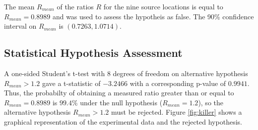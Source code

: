\documentclass[submit, 12pt]{aiaa-pretty-modified}
\begin{document}
\begin{table}[htb]
\centering
{}
\caption{Experimental Data \label{tab:data} }
\end{table}

The mean $R_{mean}$ of the ratios $R$ for the nine source locations is equal to
$R_{mean} = 0.8989$ and was used to assess the hypotheis as false. The
90\% confidence interval on $R_{mean}$ is $(0.7263, 1.0714)$.

\subsection{Statistical Hypothesis Assessment}
A one-sided Student's t-test with 8 degrees of freedom on alternative
hypothesis $R_{mean} > 1.2$ gave a t-statistic of $-3.2466$ with a
corresponding p-value of $0.9941$.  Thus, the probabilty of
obtaining a measured ratio greater than or equal to $R_{mean} = 0.8989$
is $99.4\%$ under the null hypothesis ($R_{mean} = 1.2$), so the
alternative hypothesis $R_{mean} > 1.2$ must be rejected.  Figure
\ref{fig:killer} shows a graphical representation of the experimental
data and the rejected hypothesis.
\end{document}
